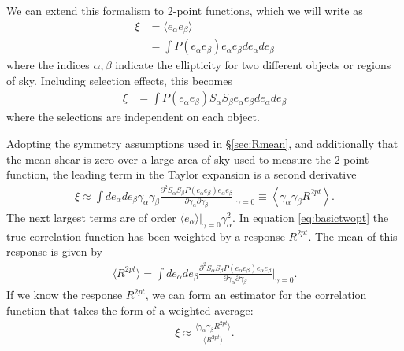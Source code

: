 \documentclass[a4paper,fleqn,usenatbib]{mnras}
\newcommand{\mcalRtwopt}{$R^{2pt}$}
\newcommand{\mcalRtwoptmean}{$\langle R^{2pt} \rangle$}
\newcommand{\probe}{$P(e_\alpha e_\beta)$}
\begin{document}
We can extend this formalism to 2-point functions, which we will write
as
\begin{align}
    \xi &= \langle e_\alpha e_\beta \rangle \nonumber \\
        &= \int \mbox{\probe} e_\alpha e_\beta d e_\alpha d e_\beta
\end{align}
where the indices $\alpha, \beta$ indicate the ellipticity for two different
objects or regions of sky.  Including selection effects, this becomes
\begin{align}
    \xi &= \int \mbox{\probe} S_\alpha S_\beta e_\alpha e_\beta d e_\alpha d e_\beta
\end{align}
where the selections are independent on each object.

Adopting the symmetry assumptions used in \S \ref{sec:Rmean}, and additionally that
the mean shear is zero over a large area of sky used to measure
the 2-point function, the leading
term in the Taylor expansion is a second derivative
\begin{align} \label{eq:basictwopt}
\xi \approx \int d e_\alpha  de_\beta  \gamma_\alpha \gamma_\beta \frac{\partial^2 S_\alpha S_\beta \mbox{\probe} e_\alpha e_\beta}{\partial \gamma_\alpha \partial \gamma_\beta}\bigg|_{\gamma=0}  \equiv \left< \gamma_\alpha \gamma_\beta \mbox{\mcalRtwopt} \right>.
\end{align}
The next largest terms are of order $ \langle e_\alpha \rangle|_{\gamma=0} \gamma_\alpha^2$.
In equation \ref{eq:basictwopt} the
true correlation function has been weighted by a response \mcalRtwopt. The mean of this response
is given by
\begin{align}
    \mbox{\mcalRtwoptmean}  = 
    \int d e_\alpha  de_\beta  \frac{\partial^2 S_\alpha S_\beta \mbox{\probe} e_\alpha e_\beta}{\partial \gamma_\alpha \partial \gamma_\beta}\bigg|_{\gamma=0}.
\end{align}
If we know the response \mcalRtwopt, we can form an estimator for the correlation function
that takes the form of a weighted average:
\begin{align}
    \xi \approx \frac{\langle \gamma_\alpha \gamma_\beta R^{2pt} \rangle}{\langle R^{2pt}\rangle}.
\end{align}
\end{document}
